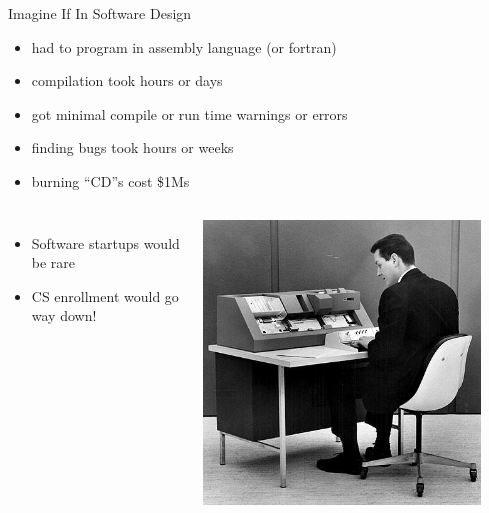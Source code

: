 \documentclass[xcolor=pdflatex,dvipsnames,table]{beamer}
\begin{document}
\begin{frame}[fragile]{Imagine If In Software Design}
\begin{itemize}
\item had to program in assembly language (or fortran)
\item compilation took hours or days
\item got minimal compile or run time warnings or errors
\item finding bugs took hours or weeks
\item burning ``CD''s cost \$1Ms 
\end{itemize}
\begin{columns}
\begin{itemize}
\item {\color{red}Software startups would be rare}
\item {\color{red}CS enrollment would go way down!}
\end{itemize}
\begin{center}
\includegraphics[width=0.9\textwidth]{figs/punch-cards.jpg}
\end{center}
\end{columns}
\end{frame}
\end{document}
